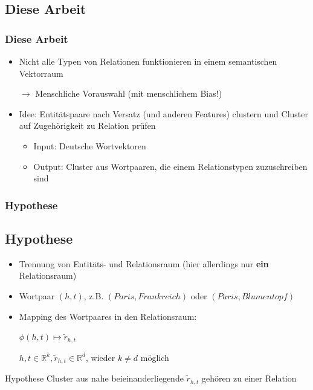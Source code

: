 \documentclass[10pt,xcolor={usenames,dvipsnames,svgnames,table}]{beamer}
\begin{document}
\begin{frame}
	\section{Diese Arbeit}
	\frametitle{Diese Arbeit}
	\begin{itemize}
		\item Nicht alle Typen von Relationen funktionieren in einem semantischen Vektorraum
		\item[$\rightarrow$ ] Menschliche Vorauswahl (mit menschlichem Bias!)
		\item Idee: Entitätspaare nach Versatz (und anderen Features) clustern und Cluster auf Zugehörigkeit zu Relation prüfen
		\begin{itemize}
			\item Input: Deutsche Wortvektoren
			\item Output: Cluster aus Wortpaaren, die einem Relationstypen zuzuschreiben sind
		\end{itemize}
	\end{itemize}
\end{frame}

\begin{frame}
	\frametitle{Hypothese}
	\subsection{Hypothese}
	\begin{itemize}
		\item Trennung von Entitäts- und Relationsraum (hier allerdings nur \textbf{ein} Relationsraum)
		\item Wortpaar $(h, t)$, z.B. $(Paris, Frankreich)$ oder $(Paris, Blumentopf)$
		\item Mapping des Wortpaares in den Relationsraum:
		\item[] $\phi(h, t) \mapsto \tilde{r}_{h, t}$
		\item[] $h, t \in \mathbb{R}^k, \tilde{r}_{h, t} \in \mathbb{R}^d$, wieder $k \neq d$ möglich
	\end{itemize}
		\begin{block}{Hypothese}
			Cluster aus nahe beieinanderliegende $\tilde{r}_{h, t}$ gehören zu einer Relation
		\end{block}
\end{frame}
\end{document}
